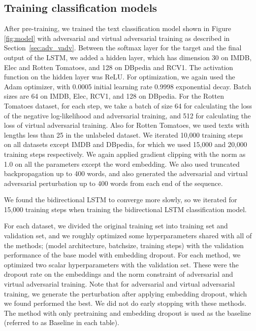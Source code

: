 \documentclass{article}
\begin{document}
\subsection{Training classification models}
After pre-training, we trained the text classification model shown in
Figure \ref{fig:model} with adversarial and virtual adversarial training as described in Section~\ref{sec:adv_vadv}.
Between the softmax layer for the target  and the final output
of the LSTM, we added a hidden layer, which has dimension 30 on IMDB, Elec and Rotten Tomatoes, and 128 on
DBpedia and RCV1.
The activation function on the hidden layer was
ReLU\cite[]{jarrett2009best,nair2010rectified,glorot2011deep}.
For optimization, we again used the Adam optimizer, with 0.0005 initial learning rate 
0.9998 exponential decay. 
Batch sizes are 64 on IMDB, Elec, RCV1, and 128 on DBpedia.
For the Rotten Tomatoes dataset, for each step, we take a batch of size 64 for 
calculating the loss of the negative log-likelihood and adversarial training,
and 512 for calculating the loss of virtual adversarial training.
Also for Rotten Tomatoes, we used texts with lengths  less than 25
in the unlabeled dataset.
We iterated 10,000 training steps on all datasets except IMDB and DBpedia, for which we used 15,000 
and 20,000 training steps respectively.
We again applied gradient clipping with the norm as 1.0 on all the parameters except the word embedding.
We also used truncated backpropagation up to 400 words, and also generated
the adversarial and virtual adversarial perturbation up to 400
words from each end of the sequence. 

We found the bidirectional LSTM to converge more slowly,
so we iterated for 15,000 training steps when training the bidirectional LSTM
classification model.

For each dataset, we divided the original training set into training set and
validation set, and we roughly optimized some hyperparameters shared with all of the methods;
(model architecture, batchsize, training steps)
with the validation performance of the base model with embedding dropout.
For each method, we optimized two scalar hyperparameters with the validation set.
These were the dropout rate on the embeddings and the norm constraint  of adversarial and virtual
adversarial training. 
Note that for adversarial and virtual adversarial training, we generate the perturbation after applying embedding dropout, 
which we found performed the best.
We did not do early stopping with these methods.
The method with only pretraining and embedding dropout is used as the baseline
(referred to as Baseline in each table). 
 
\end{document}
